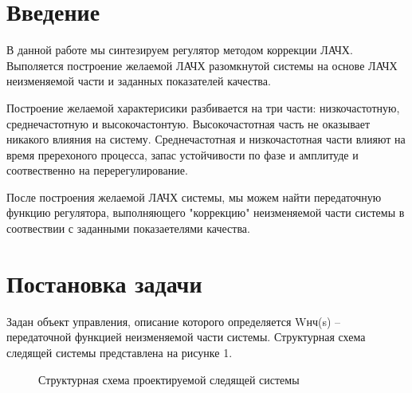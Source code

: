 \documentclass[russian, utf8]{eskdtext}
\begin{document}
\tableofcontents
\thispagestyle{empty}
\newpage

\section*{Введение}

В данной работе мы синтезируем регулятор методом коррекции ЛАЧХ. Выполяется построение желаемой ЛАЧХ разомкнутой системы на основе ЛАЧХ неизменяемой части и заданных показателей качества. \par
Построение желаемой характерисики разбивается на три части: низкочастотную, среднечастотную и высокочастонтую. Высокочастотная часть не оказывает никакого влияния на систему. Среднечастотная и низкочастотная части влияют на время пререхоного процесса, запас устойчивости по фазе и амплитуде и соотвественно на перерегулирование. \par
После построения желаемой ЛАЧХ системы, мы можем найти передаточную функцию регулятора, выполняющего "коррекцию" неизменяемой части системы в соотвествии с заданными показаетелями качества.

\newpage

\section{Постановка задачи}

Задан объект управления, описание которого определяется Wнч(s) – передаточной функцией неизменяемой части системы. Структурная схема следящей системы представлена на рисунке 1.

\begin{figure}[h!]
\centering
{}
\caption{Структурная схема проектируемой следящей системы}
\end{figure}
\end{document}
